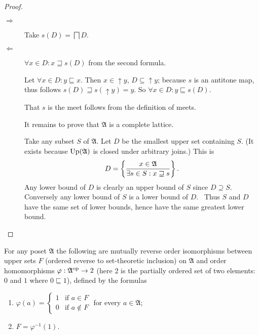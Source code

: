 \begin{proof}
~
\begin{description}
\item [{$\Rightarrow$}] Take $s(D)=\bigsqcap D$.
\item [{$\Leftarrow$}] $\forall x\in D:x\sqsupseteq s(D)$ from the second
formula.


Let $\forall x\in D:y\sqsubseteq x$. Then $x\in\uparrow y$, $D\subseteq\uparrow y$;
because $s$ is an antitone map, thus follows $s(D)\sqsupseteq s(\uparrow y)=y$.
So $\forall x\in D:y\sqsubseteq s(D)$.


That $s$ is the meet follows from the definition of meets.


It remains to prove that $\mathfrak{A}$ is a complete lattice.


Take any subset $S$ of $\mathfrak{A}$. Let $D$ be the smallest
upper set containing $S$. (It exists because $\operatorname{Up}(\mathfrak{A})$
is closed under arbitrary joins.) This is 
\[
D=\left\{ \frac{x\in\mathfrak{A}}{\exists s\in S:x\sqsupseteq s}\right\}.
\]
Any lower bound of $D$ is clearly an upper bound of $S$ since $D\supseteq S$.
Conversely any lower bound of $S$ is a lower bound of $D$.~ Thus
$S$ and $D$ have the same set of lower bounds, hence have the same
greatest lower bound.

\end{description}
\end{proof}
\begin{prop}
\label{down-is-homo}For any poset $\mathfrak{A}$ the following are
mutually reverse order isomorphisms between upper sets $F$ (ordered
reverse to set-theoretic inclusion) on $\mathfrak{A}$ and order homomorphisms
$\varphi:\mathfrak{A}^{\operatorname{op}}\rightarrow2$ (here $2$ is the partially
ordered set of two elements: $0$ and $1$ where $0\sqsubseteq1$),
defined by the formulas 
\begin{enumerate}
\item \label{phi-01}$\varphi(a)=\left\{ \begin{array}{ll}
1 & \text{if }a\in F\\
0 & \text{if }a\notin F
\end{array}\right.$ for every $a\in\mathfrak{A}$;
\item \label{phi-inv}$F=\varphi^{-1}(1)$. 
\end{enumerate}
\end{prop}
